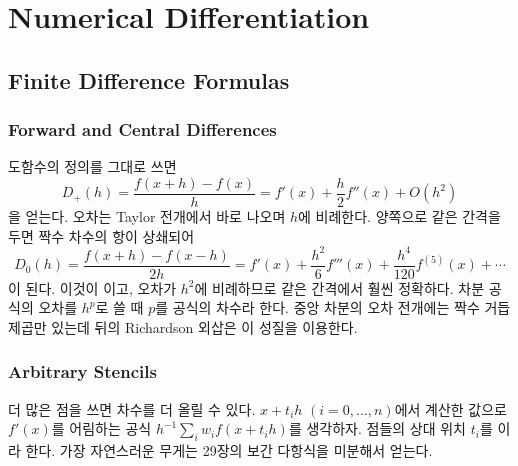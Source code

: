 \chapter{Numerical Differentiation}
\label{ch:numdiff}


\section{Finite Difference Formulas}
\label{sec:fd-formulas}

\subsection{Forward and Central Differences}

도함수의 정의를 그대로 쓰면 
\[
D_+(h)=\frac{f(x+h)-f(x)}{h}=f'(x)+\frac h2f''(x)+O(h^2)
\]
을 얻는다. 오차는 Taylor 전개에서 바로 나오며 $h$에 비례한다. 양쪽으로 같은 간격을 두면 짝수 차수의 항이 상쇄되어
\[
D_0(h)=\frac{f(x+h)-f(x-h)}{2h}=f'(x)+\frac{h^2}6f'''(x)+\frac{h^4}{120}f^{(5)}(x)+\cdots
\]
이 된다. 이것이 이고, 오차가 $h^2$에 비례하므로 같은 간격에서 훨씬 정확하다. 차분 공식의 오차를 $h^p$로 쓸 때 $p$를 공식의 차수라 한다. 중앙 차분의 오차 전개에는 짝수 거듭제곱만 있는데 뒤의 Richardson 외삽은 이 성질을 이용한다.

\subsection{Arbitrary Stencils}

더 많은 점을 쓰면 차수를 더 올릴 수 있다. $x+t_ih$ $(i=0,\dots,n)$에서 계산한 값으로 $f'(x)$를 어림하는 공식 $h^{-1}\sum_iw_if(x+t_ih)$를 생각하자. 점들의 상대 위치 $t_i$를 이라 한다. 가장 자연스러운 무게는 29장의 보간 다항식을 미분해서 얻는다.

